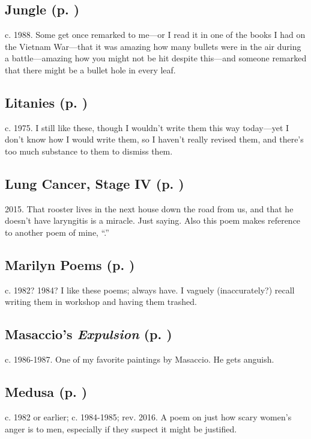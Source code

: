 \subsection*{Jungle (p. \pageref{ch:jungle})}
c. 1988. Some get once remarked to me---or I read it in
one of the books I had on the Vietnam War---that it was amazing how
many bullets were in the air during a battle---amazing how you might
not be hit despite this---and someone remarked that there might be a
bullet hole in every leaf.

\subsection*{Litanies (p. \pageref{ch:litanies})}
c. 1975. I still like these, though I wouldn't write
them this way today---yet I don't know how I would write them, so I
haven't really revised them, and there's too much substance to them to
dismiss them.

\subsection*{Lung Cancer, Stage IV (p. \pageref{ch:lung_cancer})}
2015. That rooster lives in the next house down the road
from us, and that he doesn't have laryngitis is a miracle. Just saying.
Also this poem makes reference to another poem of mine, ``.''

\subsection*{Marilyn Poems (p. \pageref{ch:marilyn_poems})}
c. 1982? 1984? I like these poems; always have. I
vaguely (inaccurately?) recall writing them in workshop and having them
trashed.

\subsection*{Masaccio's \textit{Expulsion} (p. \pageref{ch:masaccio})}
c. 1986-1987. One of my favorite paintings by Masaccio.
He gets anguish.

\subsection*{Medusa (p. \pageref{ch:medusa})}
c. 1982 or earlier; c. 1984-1985; rev. 2016. A poem on
just how scary women's anger is to men, especially if they suspect it
might be justified.

